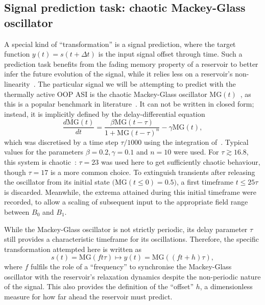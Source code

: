 \subsection{Signal prediction task: chaotic Mackey-Glass oscillator} \label{sec:3:Thermal_Prediction}
A special kind of ``transformation'' is a signal prediction, where the target function $y(t) = s(t + \Delta t)$ is the input signal offset through time.
Such a prediction task benefits from the fading memory property of a reservoir to better infer the future evolution of the signal, while it relies less on a reservoir's non-linearity~\cite{TaskAdaptivePRC}.
The particular signal we will be attempting to predict with the thermally active OOP ASI is the chaotic Mackey-Glass oscillator $\mathrm{MG}(t)$~\cite{MackeyGlass}, as this is a popular benchmark in literature~\cite{RotatingNeuronsRC,AdaptiveProgrammableRC,TaskAdaptivePRC,Moon_2021,JaegerHaasWireless,ArchitecturalMarkovianESN}.
It can not be written in closed form; instead, it is implicitly defined by the delay-differential equation
\begin{equation}
	\label{eq:3:MG}
	\frac{d\mathrm{MG}(t)}{dt} = \frac{\beta \mathrm{MG}(t - \tau)}{1 + \mathrm{MG}(t - \tau)^n} - \gamma \mathrm{MG}(t) \mathrm{,}
\end{equation}
which was discretised by a time step $\tau/1000$ using the integration of~.
Typical values for the parameters $\beta=0.2, \gamma=0.1$ and $n=10$ were used.
For $\tau \gtrsim 16.8$, this system is chaotic~\cite{jaeger2001echo}: $\tau=23$ was used here to get sufficiently chaotic behaviour, though $\tau=17$ is a more common choice.
To extinguish transients after releasing the oscillator from its initial state $\big(\mathrm{MG}(t \leq 0) = 0.5\big)$, a first timeframe $t \leq 25\tau$ is discarded.
Meanwhile, the extrema attained during this initial timeframe were recorded, to allow a scaling of subsequent input to the appropriate field range between $B_0$ and $B_1$. \par
While the Mackey-Glass oscillator is not strictly periodic, its delay parameter $\tau$ still provides a characteristic timeframe for its oscillations.
Therefore, the specific transformation attempted here is written as
\begin{equation}
	s(t) = \mathrm{MG}(ft\tau) \mapsto y(t) = \mathrm{MG}((ft + h)\tau) \mathrm{,}
\end{equation}
where $f$ fulfils the role of a ``frequency'' to synchronise the Mackey-Glass oscillator with the reservoir's relaxation dynamics despite the non-periodic nature of the signal.
This also provides the definition of the ``offset'' $h$, a dimensionless measure for how far ahead the reservoir must predict. \\\par

